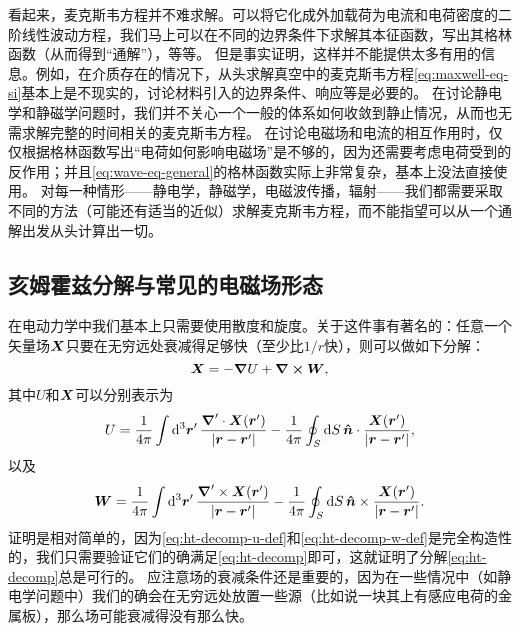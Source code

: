 看起来，麦克斯韦方程并不难求解。可以将它化成外加载荷为电流和电荷密度的二阶线性波动方程，我们马上可以在不同的边界条件下求解其本征函数，写出其格林函数（从而得到“通解”），等等。
但是事实证明，这样并不能提供太多有用的信息。例如，在介质存在的情况下，从头求解真空中的麦克斯韦方程\eqref{eq:maxwell-eq-si}基本上是不现实的，讨论材料引入的边界条件、响应等是必要的。
在讨论静电学和静磁学问题时，我们并不关心一个一般的体系如何收敛到静止情况，从而也无需求解完整的时间相关的麦克斯韦方程。
在讨论电磁场和电流的相互作用时，仅仅根据格林函数写出“电荷如何影响电磁场”是不够的，因为还需要考虑电荷受到的反作用；并且\eqref{eq:wave-eq-general}的格林函数实际上非常复杂，基本上没法直接使用。
对每一种情形——静电学，静磁学，电磁波传播，辐射——我们都需要采取不同的方法（可能还有适当的近似）求解麦克斯韦方程，而不能指望可以从一个通解出发从头计算出一切。

\subsection{亥姆霍兹分解与常见的电磁场形态}

在电动力学中我们基本上只需要使用散度和旋度。关于这件事有著名的：任意一个矢量场$\vb*{X}$只要在无穷远处衰减得足够快（至少比$1 / r$快），则可以做如下分解：
\begin{equation}
    \vb*{X} = - \grad{U} + \curl{\vb*{W}},
    \label{eq:ht-decomp}
\end{equation}
其中$U$和$\vb*{X}$可以分别表示为
\begin{equation}
    U = \frac{1}{4\pi} \int \dd[3]{\vb*{r}'} \frac{\grad' \cdot \vb*{X}(\vb*{r}')}{\abs{\vb*{r} - \vb*{r}'}} - \frac{1}{4\pi} \oint_S \dd{S} \vu*{n} \cdot \frac{\vb*{X}(\vb*{r}')}{\abs{\vb*{r} - \vb*{r}'}},
    \label{eq:ht-decomp-u-def}
\end{equation}
以及
\begin{equation}
    \vb*{W} = \frac{1}{4\pi} \int \dd[3]{\vb*{r}'} \frac{\grad' \times \vb*{X}(\vb*{r}')}{\abs{\vb*{r} - \vb*{r}'}} - \frac{1}{4\pi} \oint_S \dd{S} \vu*{n} \times \frac{\vb*{X}(\vb*{r}')}{\abs{\vb*{r} - \vb*{r}'}}.
    \label{eq:ht-decomp-w-def}
\end{equation}
证明是相对简单的，因为\eqref{eq:ht-decomp-u-def}和\eqref{eq:ht-decomp-w-def}是完全构造性的，我们只需要验证它们的确满足\eqref{eq:ht-decomp}即可，这就证明了分解\eqref{eq:ht-decomp}总是可行的。
应注意场的衰减条件还是重要的，因为在一些情况中（如静电学问题中）我们的确会在无穷远处放置一些源（比如说一块其上有感应电荷的金属板），那么场可能衰减得没有那么快。

